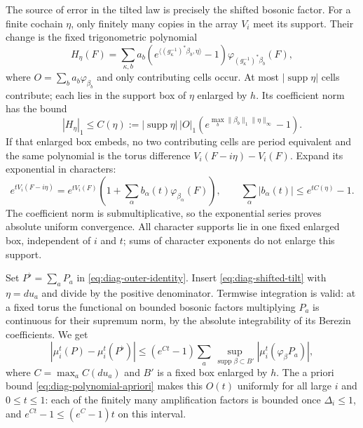 \documentclass[11pt,letterpaper,reqno]{amsart}
\DeclareMathOperator{\supp}{supp}
\begin{document}
The source of error in the tilted law is precisely the shifted
bosonic factor. For a finite cochain $\eta$, only finitely
many copies in the array $V_i$ meet its support. Their change
is the fixed trigonometric polynomial
\begin{equation}\label{eq:diag-array-shift}
 H_\eta(F)=\sum_{\kappa,b}a_b
       (e^{\langle(g_\kappa^{-1})^*\beta_b,\eta\rangle}-1)
                        \varphi_{(g_\kappa^{-1})^*\beta_b}(F),
\end{equation}
where $O=\sum_ba_b\varphi_{\beta_b}$ and only contributing
cells occur. At most $|\supp\eta|$ cells contribute; each
lies in the support box of $\eta$ enlarged by $h$. Its
coefficient norm has the bound
\begin{equation}\label{eq:diag-array-shift-size}
 |H_\eta|_1\le C(\eta):=|\supp\eta|\,|O|_1
        (e^{\max_b\|\beta_b\|_1\|\eta\|_\infty}-1).
\end{equation}
If that enlarged box embeds, no two contributing cells are
period equivalent and the same polynomial is the torus
difference $V_i(F-i\eta)-V_i(F)$. Expand its exponential
in characters:
\begin{equation}\label{eq:diag-shifted-tilt}
 e^{tV_i(F-i\eta)}=e^{tV_i(F)}
        \left(1+\sum_\alpha b_\alpha(t)\varphi_{\beta_\alpha}(F)\right),
 \qquad\sum_\alpha|b_\alpha(t)|\le e^{tC(\eta)}-1.
\end{equation}
The coefficient norm is submultiplicative, so the exponential
series proves absolute uniform convergence. All character
supports lie in one fixed enlarged box, independent of $i$
and $t$; sums of character exponents do not enlarge this support.

Set $P^\flat=\sum_aP_a$ in \eqref{eq:diag-outer-identity}.
Insert \eqref{eq:diag-shifted-tilt} with $\eta=du_a$ and divide
by the positive denominator. Termwise integration is valid:
at a fixed torus the functional on bounded bosonic factors
multiplying $P_a$ is continuous for their supremum norm, by
the absolute integrability of its Berezin coefficients.
We get
\begin{equation}\label{eq:diag-outer-error}
 |\mu_i^t(P)-\mu_i^t(P^\flat)|
 \le(e^{Ct}-1)\sum_a
       \sup_{\supp\beta\subset B'}|\mu_i^t(\varphi_\beta P_a)|,
\end{equation}
where $C=\max_aC(du_a)$ and $B'$ is a fixed box enlarged
by $h$. The a priori bound
\eqref{eq:diag-polynomial-apriori} makes this $O(t)$ uniformly
for all large $i$ and $0\le t\le1$: each of the finitely many
amplification factors is bounded once $\Delta_i\le1$, and
$e^{Ct}-1\le(e^C-1)t$ on this interval.
\end{document}
